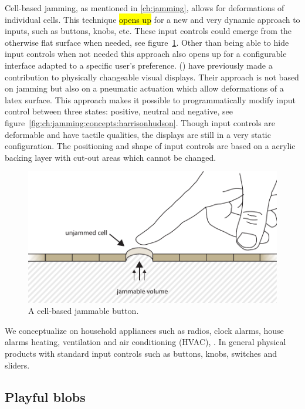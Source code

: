 Cell-based jamming, as mentioned in \ref{ch:jamming}, allows for deformations of individual cells.
This technique \hl{opens up} for a new and very dynamic approach to inputs, such as buttons, knobs, etc.
These input controls could emerge from the otherwise flat surface when needed, see figure~\ref{fig:ch:jamming:concepts:button}.
Other than being able to hide input controls when not needed this approach also opens up for a configurable interface adapted to a specific user's preference.
\citet{harrison2009providing} (\citeyear{harrison2009providing}) have previously made a contribution to physically changeable visual displays.
Their approach is not based on jamming but also on a pneumatic actuation which allow deformations of a latex surface.
This approach makes it possible to programmatically modify input control between three states: positive, neutral and negative, see figure~\ref{fig:ch:jamming:concepts:harrisonhudson}.
Though input controls are deformable and have tactile qualities, the displays are still in a very static configuration.
The positioning and shape of input controls are based on a acrylic backing layer with cut-out areas which cannot be changed.

\begin{figure}[h]
  \centering
      \includegraphics[width=.9\textwidth]{figures/jamming/concepts/jamming_button}
  \caption[A cell-based jammable button.]
  {A cell-based jammable button.}
  \label{fig:ch:jamming:concepts:button}
\end{figure}

We conceptualize on household appliances such as radios, clock alarms, house alarms heating, ventilation and air conditioning (HVAC), .
In general physical products with standard input controls such as buttons, knobs, switches and sliders.

\subsection{Playful blobs}
\label{ch:jamming:concepts:playful_blobs}

